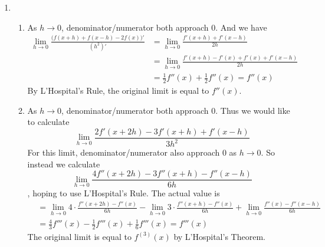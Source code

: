 \documentclass[11pt]{report}
\newcommand{\ra}{\rightarrow}
\begin{document}
\begin{enumerate}
\item 
\begin{enumerate}
	\item As $h\ra 0$, denominator/numerator both approach 0. And we have
	$$\begin{aligned}
		\lim_{h\ra0} \frac{\big(f(x+h)+f(x-h)-2f(x)\big)'}{(h^2)'} &= \lim_{h\ra0} \frac{f'(x+h)+f'(x-h)}{2h} 
		\\&= \lim_{h\ra0} \frac{f'(x+h)-f'(x) + f'(x)+f'(x-h)}{2h} \\
		&= \frac{1}{2}f''(x) + \frac{1}{2}f''(x) = f''(x) 
	\end{aligned}$$
	By L'Hospital's Rule, the original limit is equal to $f''(x)$.

	\item As $h\ra 0$, denominator/numerator both approach 0. Thus we would like to calculate
	$$\lim_{h\ra0}\frac{2f'(x+2h)-3f'(x+h)+f'(x-h)}{3h^2} $$
	For this limit, denominator/numerator also approach 0 as $h\ra 0$. So instead we calculate
	$$\lim_{h\ra0} \frac{4f''(x+2h) -3f''(x+h)-f''(x-h)}{6h}$$
	, hoping to use L'Hospital's Rule. The actual value is
	$$\begin{aligned}
	&=\lim_{h\ra0} 4\cdot \frac{f''(x+2h)-f''(x)}{6h} - \lim_{h\ra0} 3\cdot \frac{f''(x+h)-f''(x)}{6h}  + \lim_{h\ra0} \frac{f''(x)-f''(x-h)}{6h} \\
	&= \frac{4}{3}f'''(x) - \frac{1}{2}f'''(x) + \frac{1}{6}f'''(x) = f'''(x) 
	\end{aligned}$$
	The original limit is equal to $f^{(3)}(x)$ by L'Hospital's Theorem.
\end{enumerate}

\end{enumerate}
\end{document}
